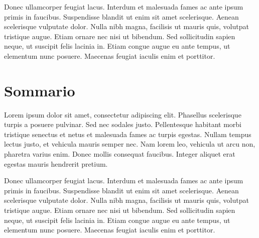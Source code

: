 Donec ullamcorper feugiat lacus. Interdum et malesuada fames ac ante ipsum primis in faucibus. Suspendisse blandit ut enim sit amet scelerisque. Aenean scelerisque vulputate dolor. Nulla nibh magna, facilisis ut mauris quis, volutpat tristique augue. Etiam ornare nec nisi ut bibendum. Sed sollicitudin sapien neque, ut suscipit felis lacinia in. Etiam congue augue eu ante tempus, ut elementum nunc posuere. Maecenas feugiat iaculis enim et porttitor.

\chapter*{Sommario}

Lorem ipsum dolor sit amet, consectetur adipiscing elit. Phasellus scelerisque turpis a posuere pulvinar. Sed nec sodales justo. Pellentesque habitant morbi tristique senectus et netus et malesuada fames ac turpis egestas. Nullam tempus lectus justo, et vehicula mauris semper nec. Nam lorem leo, vehicula ut arcu non, pharetra varius enim. Donec mollis consequat faucibus. Integer aliquet erat egestas mauris hendrerit pretium.

Donec ullamcorper feugiat lacus. Interdum et malesuada fames ac ante ipsum primis in faucibus. Suspendisse blandit ut enim sit amet scelerisque. Aenean scelerisque vulputate dolor. Nulla nibh magna, facilisis ut mauris quis, volutpat tristique augue. Etiam ornare nec nisi ut bibendum. Sed sollicitudin sapien neque, ut suscipit felis lacinia in. Etiam congue augue eu ante tempus, ut elementum nunc posuere. Maecenas feugiat iaculis enim et porttitor.

